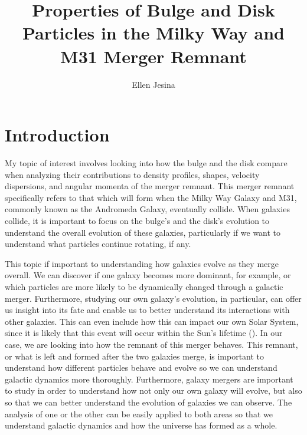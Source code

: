 \documentclass[twocolumn]{aastex631}
\begin{document}
\title{Properties of Bulge and Disk Particles in the Milky Way and M31 Merger Remnant}

\author{Ellen Jesina}

\section{Introduction} \label{sec:intro}
My topic of interest involves looking into how the bulge and the disk compare when analyzing their contributions to density profiles, shapes, velocity dispersions, and angular momenta of the merger remnant. This merger remnant specifically refers to that which will form when the Milky Way Galaxy and M31, commonly known as the Andromeda Galaxy, eventually collide. When galaxies collide, it is important to focus on the bulge's and the disk's evolution to understand the overall evolution of these galaxies, particularly if we want to understand what particles continue rotating, if any. 


This topic if important to understanding how galaxies evolve as they merge overall. We can discover if one galaxy becomes more dominant, for example, or which particles are more likely to be dynamically changed through a galactic merger. Furthermore, studying our own galaxy's evolution, in particular, can offer us insight into its fate and enable us to better understand its interactions with other galaxies. This can even include how this can impact our own Solar System, since it is likely that this event will occur within the Sun's lifetime (\cite{Cox_2008}). In our case, we are looking into how the remnant of this merger behaves. This remnant, or what is left and formed after the two galaxies merge, is important to understand how different particles behave and evolve so we can understand galactic dynamics more thoroughly. Furthermore, galaxy mergers are important to study in order to understand how not only our own galaxy will evolve, but also so that we can better understand the evolution of galaxies we can observe. The analysis of one or the other can be easily applied to both areas so that we understand galactic dynamics and how the universe has formed as a whole. 
\end{document}

